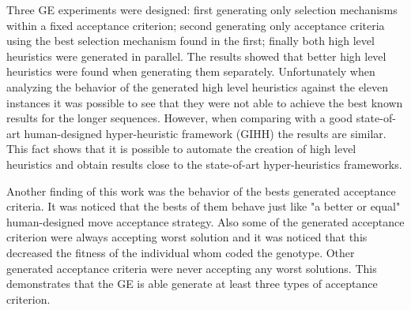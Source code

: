 \documentclass[conference]{IEEEtran}
\begin{document}
Three GE experiments were designed: first generating only selection mechanisms within a fixed acceptance criterion; second generating only acceptance criteria using the best selection mechanism found in the first; finally both high level heuristics were generated in parallel. The results showed that better high level heuristics were found when generating them separately. Unfortunately when analyzing the behavior of the generated high level heuristics against the eleven instances it was possible to see that they were not able to achieve the best known results for the longer sequences. However, when comparing with a good state-of-art human-designed hyper-heuristic framework (GIHH) \cite{misir2012intelligent} the results are similar. This fact shows that it is possible to automate the creation of high level heuristics and obtain results close to the state-of-art hyper-heuristics frameworks.

 Another finding of this work was the behavior of the bests generated acceptance criteria. It was noticed that the bests of them behave just like "a better or equal" human-designed move acceptance strategy. Also some of the generated acceptance criterion were always accepting worst solution and it was noticed that this decreased the fitness of the individual whom coded the genotype. Other generated acceptance criteria were never accepting any worst solutions. This demonstrates that the GE is able generate at least three types of acceptance criterion.  

  











%
%
%
	
	



\end{document}
